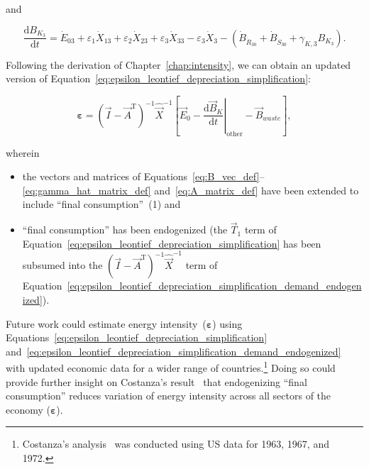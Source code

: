 \noindent{}and

\begin{equation} \label{eq:C-Total_Energy_Sec_3-unfinished}
	\frac{\mathrm{d}B_{K_{3}}}{\mathrm{d}t}
	= \dot{E}_{03}
	+ \varepsilon_{1} \dot{X}_{13}
	+ \varepsilon_{2} \dot{X}_{23}
	+ \varepsilon_{3} \dot{X}_{33}
	- \varepsilon_{3} \dot{X}_{3}
	- \left( \dot{B}_{\dot{R}_{30}} 
							+ \dot{B}_{\dot{S}_{30}}
							+ \gamma_{K,3} B_{K_{3}}
							\right).
\end{equation}

\noindent{}Following the derivation of Chapter~\ref{chap:intensity},
we can obtain an updated version 
of Equation~\ref{eq:epsilon_leontief_depreciation_simplification}:

\begin{equation} \label{eq:epsilon_leontief_depreciation_simplification_demand_endogenized}
	\bm{\varepsilon} 
	= {(\vec{I} - \vec{A}^{\mathrm{T}})}^{-1}\hat{\vec{X}}^{-1}
		\left[\vec{E}_{0} 
				- \left. \frac{\mathrm{d}\vec{B}_{K}}{\mathrm{d}t} \right|_{\mathrm{other}}
				- \vec{B}_{waste}
		\right],
\end{equation}

\noindent{}wherein 

\begin{itemize}
	\item{the vectors and matrices of Equations~\ref{eq:B_vec_def}--\ref{eq:gamma_hat_matrix_def}
	and~\ref{eq:A_matrix_def} have been extended to include ``final consumption''~(1) and}
	\item{ ``final consumption'' has been endogenized
	(the $\vec{T}_{1}$ term of Equation~\ref{eq:epsilon_leontief_depreciation_simplification}
	has been subsumed into the 
	${(\vec{I} - \vec{A}^{\mathrm{T}})}^{-1}\hat{\vec{X}}^{-1}$
	term of Equation~\ref{eq:epsilon_leontief_depreciation_simplification_demand_endogenized}).}
\end{itemize}

Future work could estimate energy intensity~($\bm{\varepsilon}$) 
using Equations~\ref{eq:epsilon_leontief_depreciation_simplification}
and~\ref{eq:epsilon_leontief_depreciation_simplification_demand_endogenized}
with updated economic data for a wider range of countries.\footnote{Costanza's
analysis~\cite{Costanza:1980ww} was conducted using US data for 1963, 1967, and 1972.}
Doing so could provide further insight on Costanza's result~\cite{Costanza:1980ww}
that endogenizing ``final consumption'' reduces variation 
of energy intensity across all sectors of the economy ($\bm{\varepsilon}$).


